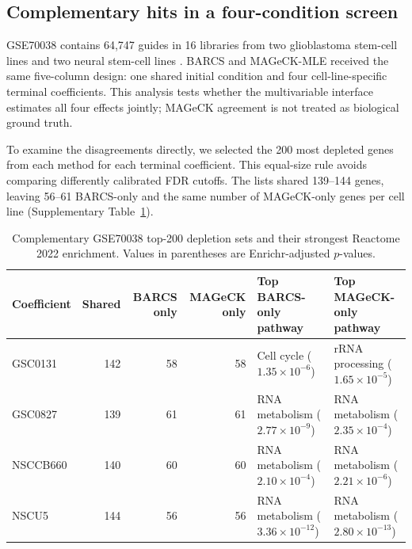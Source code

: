 \subsection{Complementary hits in a four-condition screen}
\label{sec:gse70038}

GSE70038 contains 64,747 guides in 16 libraries from two glioblastoma
stem-cell lines and two neural stem-cell lines \citep{toledo2015pkmyt1}.
BARCS and MAGeCK-MLE received the same five-column design: one shared initial
condition and four cell-line-specific terminal coefficients.  This analysis
tests whether the multivariable interface estimates all four effects jointly;
MAGeCK agreement is not treated as biological ground truth.

To examine the disagreements directly, we selected the 200 most depleted genes
from each method for each terminal coefficient.  This equal-size rule avoids
comparing differently calibrated FDR cutoffs.  The lists shared 139--144 genes,
leaving 56--61 BARCS-only and the same number of MAGeCK-only genes per cell
line (Supplementary Table~\ref{tab:gse-enrichment}).

\begin{table}[htbp]
\centering
\caption{Complementary GSE70038 top-200 depletion sets and their strongest
Reactome 2022 enrichment.  Values in parentheses are Enrichr-adjusted
$p$-values.}
\label{tab:gse-enrichment}
\footnotesize
\setlength{\tabcolsep}{3pt}
\begin{tabular}{lrrr p{} p{}}
\toprule
Coefficient & Shared & BARCS only & MAGeCK only &
Top BARCS-only pathway & Top MAGeCK-only pathway\\
\midrule
GSC0131 & 142 & 58 & 58 &
Cell cycle ($1.35\times10^{-6}$) &
rRNA processing ($1.65\times10^{-5}$)\\
GSC0827 & 139 & 61 & 61 &
RNA metabolism ($2.77\times10^{-9}$) &
RNA metabolism ($2.35\times10^{-4}$)\\
NSCCB660 & 140 & 60 & 60 &
RNA metabolism ($2.10\times10^{-4}$) &
RNA metabolism ($2.21\times10^{-6}$)\\
NSCU5 & 144 & 56 & 56 &
RNA metabolism ($3.36\times10^{-12}$) &
RNA metabolism ($2.80\times10^{-13}$)\\
\bottomrule
\end{tabular}
\end{table}

